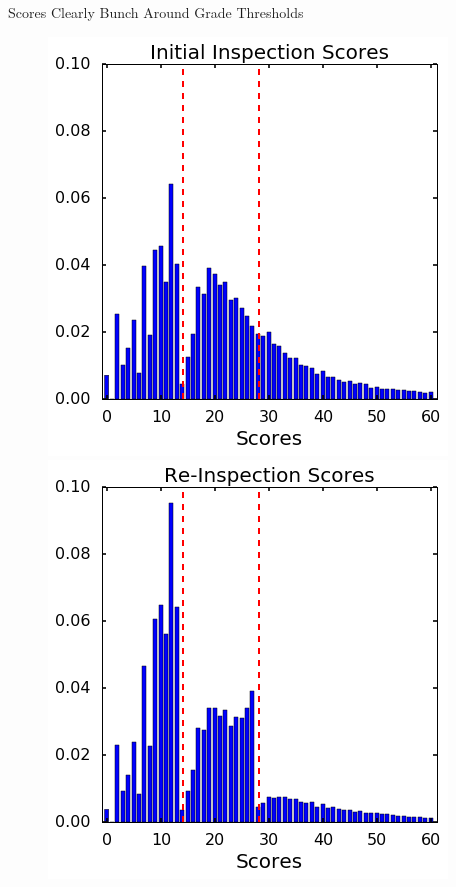 \documentclass{beamer}
\begin{document}
\begin{frame}{Scores Clearly Bunch Around Grade Thresholds}
\begin{figure}
    \centering
    \includegraphics[scale = 0.4]{../../Figures/init_score.png}
    \includegraphics[scale = 0.4]{../../Figures/re_score.png}
\end{figure}
\end{frame}
\end{document}
